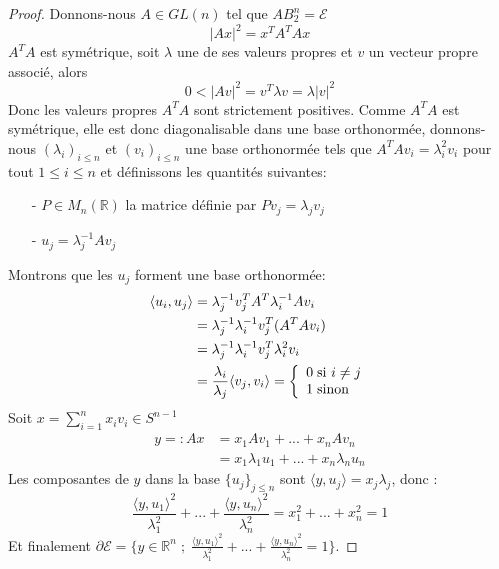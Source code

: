 \documentclass[12pt]{article}
\theoremstyle{definition}
\begin{document}
\begin{proof}
	Donnons-nous $A\in GL(n)$ tel que $AB_2^n=\mathcal{E}$
	\begin{equation*}
	|Ax|^2 = x^T A^TAx 
	\end{equation*}
	$A^T A$ est symétrique, soit $\lambda$ une de ses valeurs propres et $v$ un vecteur propre associé, alors  
	\begin{equation*}
	0< |Av|^2 = v^T \lambda v = \lambda |v|^2
	\end{equation*}
	Donc les valeurs propres $A^TA$ sont strictement positives. Comme $A^TA$ est symétrique, elle est donc diagonalisable dans une base orthonormée, donnons-nous $(\lambda_i)_{i\leq n}$ et $(v_i)_{i\leq n}$ une base orthonormée tels que $A^TAv_i = \lambda_i^2 v_i$ pour tout $1\leq i\leq n$ et définissons les quantités suivantes:
	\begin{enumerate}
		\item[-] $P\in M_n(\mathbb{R})$ la matrice définie par $Pv_j = \lambda_j v_j$
		\item[-] $u_j=\lambda_j^{-1}Av_j$
	\end{enumerate}
	Montrons que les $u_j$ forment une base orthonormée: 
	\begin{align*}
	\langle u_i,u_j\rangle &= \lambda_j^{-1}v_j^TA^T \lambda_i^{-1}Av_i\\
	&=\lambda_j^{-1}\lambda_i^{-1}v_j^T(A^T Av_i) \\
	&= \lambda_j^{-1}\lambda_i^{-1}v_j^T \lambda_i^2 v_i\\
	&=\frac{\lambda_i}{\lambda_j} \langle v_j,v_i\rangle = \left\{ \begin{array}{ll} 0 \hspace{1mm}\text{si $i\neq j$} \\ 1 \hspace{1mm}\text{sinon} \end{array} \right.
	\end{align*}
	Soit $x = \sum_{i=1}^{n}x_i v_i\in S^{n-1}$  
	\begin{align*}
	y=: Ax&= x_1Av_1+...+x_nAv_n \\ 
	&= x_1 \lambda_1 u_1 + ... + x_n \lambda_n u_n
	\end{align*}
	Les composantes de $y$ dans la base $\{u_j\}_{j\leq n}$ sont $\langle y,u_j\rangle = x_j\lambda_j$, donc :
	\begin{equation*}
	\frac{\langle y,u_1\rangle ^2}{\lambda_1^2}+...+\frac{\langle y,u_n\rangle ^2}{\lambda_n^2} = x_1^2+...+x_n^2 =1
	\end{equation*}
	Et finalement $\partial \mathcal{E} = \big\{y\in\mathbb{R}^n \; ; \; \frac{\langle y,u_1\rangle ^2}{\lambda_1^2}+...+\frac{\langle y,u_n\rangle ^2}{\lambda_n^2} = 1\big\} $.
\end{proof}
\end{document}
